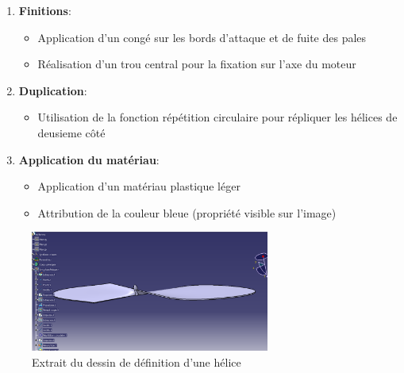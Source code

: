 \documentclass[a4paper,12pt]{report}
\begin{document}
\begin{enumerate}
    \item \textbf{Finitions}:
    \begin{itemize}
        \item Application d'un congé sur les bords d'attaque et de fuite des pales
        \item Réalisation d'un trou central pour la fixation sur l'axe du moteur
    \end{itemize}
    
    \item \textbf{Duplication}:
    \begin{itemize}
        \item Utilisation de la fonction répétition circulaire pour répliquer les hélices de deusieme côté
    \end{itemize}
    
    \item \textbf{Application du matériau}:
    \begin{itemize}
        \item Application d'un matériau plastique léger
        \item Attribution de la couleur bleue (propriété visible sur l'image)
    \end{itemize}
\end{enumerate}

\begin{figure}[H]
    \centering
    \includegraphics[width=0.7\textwidth]{images/helice_drone.png}
    \caption{Extrait du dessin de définition d'une hélice}
    \label{fig:dessin_helice}
\end{figure}
\end{document}
